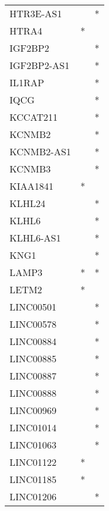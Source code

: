 \begin{longtable}{lcc}
HTR3E-AS1        &                &          * \\
HTRA4            &              * &            \\
IGF2BP2          &                &          * \\
IGF2BP2-AS1      &                &          * \\
IL1RAP           &                &          * \\
IQCG             &                &          * \\
KCCAT211         &                &          * \\
KCNMB2           &                &          * \\
KCNMB2-AS1       &                &          * \\
KCNMB3           &                &          * \\
KIAA1841         &              * &            \\
KLHL24           &                &          * \\
KLHL6            &                &          * \\
KLHL6-AS1        &                &          * \\
KNG1             &                &          * \\
LAMP3            &              * &          * \\
LETM2            &              * &            \\
LINC00501        &                &          * \\
LINC00578        &                &          * \\
LINC00884        &                &          * \\
LINC00885        &                &          * \\
LINC00887        &                &          * \\
LINC00888        &                &          * \\
LINC00969        &                &          * \\
LINC01014        &                &          * \\
LINC01063        &                &          * \\
LINC01122        &              * &            \\
LINC01185        &              * &            \\
LINC01206        &                &          * \\

\end{longtable}
